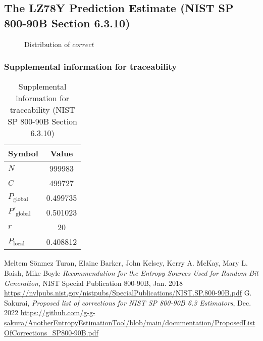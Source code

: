 \documentclass[a3paper,xelatex,english]{bxjsarticle}
\begin{document}
\subsection{The LZ78Y Prediction Estimate (NIST SP 800-90B Section 6.3.10)}
\begin{figure}[htbp]
\centering

\caption{Distribution of $correct$}
\end{figure}
\subsubsection{Supplemental information for traceability}
\renewcommand{\arraystretch}{1.8}
\begin{table}[h]
\caption{Supplemental information for traceability (NIST SP 800-90B Section 6.3.10)}
\begin{center}
\begin{tabular}{|l|c|}
\hline 
\rowcolor{anotherlightblue} %
Symbol				& Value \\ \hline 
$N$				& 999983\\ \hline 
$C$				& 499727\\ \hline 
$P_{\textrm{global}}$				& 0.499735\\ \hline 
$P'_{\textrm{global}}$			& 0.501023\\ \hline 
$r$				& 20\\ \hline 
$P_{\textrm{local}}$ 			& 0.408812\\ \hline
\end{tabular}
\end{center}
\end{table}
\renewcommand{\arraystretch}{1.4}
\begin{thebibliography}{99}
Meltem S\"{o}nmez Turan,
Elaine Barker,
John Kelsey,
Kerry A. McKay,
Mary L. Baish,
Mike Boyle
\textit{Recommendation for the Entropy Sources Used for Random Bit Generation},
NIST Special Publication 800-90B, Jan. 2018 
\url{https://nvlpubs.nist.gov/nistpubs/SpecialPublications/NIST.SP.800-90B.pdf}
G. Sakurai, \textit{Proposed list of corrections for NIST SP 800-90B 6.3 Estimators}, Dec. 2022 
\url{https://github.com/g-g-sakura/AnotherEntropyEstimationTool/blob/main/documentation/ProposedListOfCorrections_SP800-90B.pdf}
\end{thebibliography}
\end{document}
